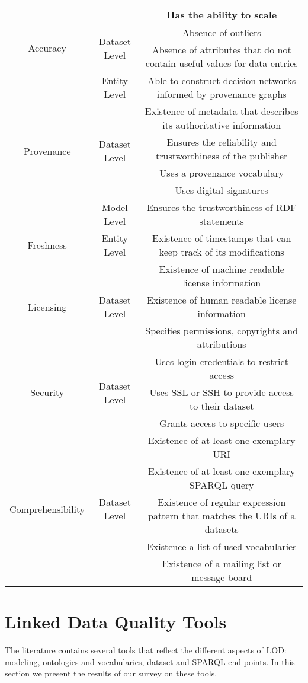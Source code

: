 \documentclass[onecolumn, crcready]{iosart2c}
\begin{document}
\begin{landscape}
\begin{center}
\begin{longtable}[h]{|c|c|c|}
\cline{3-3} 
 &  & Has the ability to scale \tabularnewline
\hline 
\hline 
\multirow{2}{*}{Accuracy} & \multirow{2}{*}{Dataset Level} & Absence of outliers\tabularnewline
\cline{3-3} 
 &  & Absence of attributes that do not contain useful values for data entries\tabularnewline
\hline
\hline 
\multirow{6}{*}{Provenance} & \multirow{1}{*}{Entity Level} & Able to construct decision networks informed by provenance graphs\tabularnewline
\cline{2-3} 
 & \multirow{4}{*}{Dataset Level} & Existence of metadata that describes its authoritative information\tabularnewline
\cline{3-3} 
 &  & Ensures the reliability and trustworthiness of the publisher\tabularnewline
\cline{3-3} 
 &  & Uses a provenance vocabulary\tabularnewline
\cline{3-3} 
 &  & Uses digital signatures\tabularnewline
\cline{2-3} 
 & \multirow{1}{*}{Model Level} & Ensures the trustworthiness of RDF statements\tabularnewline
\hline 
\multirow{1}{*}{Freshness} & \multirow{1}{*}{Entity Level} & Existence of timestamps that can keep track of its modifications\tabularnewline
\hline 
\hline 
\multirow{3}{*}{Licensing} & \multirow{3}{*}{Dataset Level} & Existence of machine readable license information\tabularnewline
\cline{3-3} 
 &  & Existence of human readable license information\tabularnewline
\cline{3-3} 
 &  & Specifies permissions, copyrights and attributions\tabularnewline
\hline  
\hline 
\multirow{3}{*}{Security} & \multirow{3}{*}{Dataset Level} & Uses login credentials to restrict access\tabularnewline
\cline{3-3} 
 &  & Uses SSL or SSH to provide access to their dataset\tabularnewline
\cline{3-3} 
 &  & Grants access to specific users\tabularnewline
\hline 
\hline 
\multirow{5}{*}{Comprehensibility} & \multirow{5}{*}{Dataset Level} & Existence of at least one exemplary URI\tabularnewline
\cline{3-3} 
 &  & Existence of at least one exemplary SPARQL query\tabularnewline
\cline{3-3} 
 &  & Existence of regular expression pattern that matches the URIs of a datasets\tabularnewline
\cline{3-3} 
 &  & Existence a list of used vocabularies \tabularnewline
\cline{3-3} 
 &  & Existence of a mailing list or message board\tabularnewline
\end{longtable}
\end{center}
\end{landscape}

\section{Linked Data Quality Tools}
The literature contains several tools that reflect the different aspects of LOD: modeling, ontologies and vocabularies, dataset and SPARQL end-points. In this section we present the results of our survey on these tools.
\end{document}
